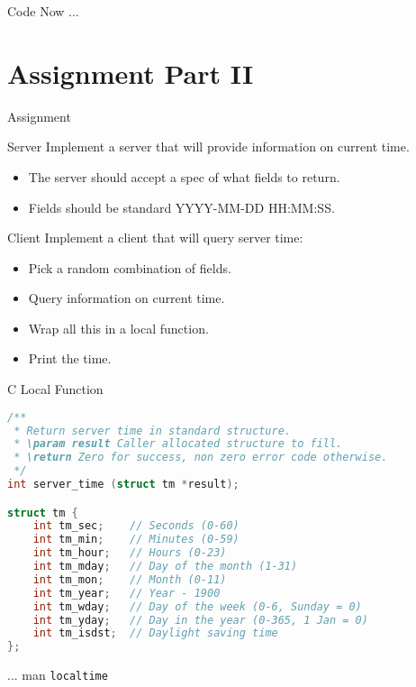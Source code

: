 \begin{frame}{Code Now ...}
\end{frame}


\section{Assignment Part II}


\begin{frame}{Assignment}
    \begin{block}{Server}
        Implement a server that will provide information on current time.
        \begin{itemize}
            \item The server should accept a spec of what fields to return.
            \item Fields should be standard YYYY-MM-DD HH:MM:SS.
        \end{itemize}
    \end{block}

    \begin{block}{Client}
        Implement a client that will query server time:
        \begin{itemize}
            \item Pick a random combination of fields.
            \item Query information on current time.
            \item Wrap all this in a local function.
            \item Print the time.
        \end{itemize}
    \end{block}
\end{frame}


\begin{frame}[fragile]{C Local Function}
\begin{lstlisting}[language=c,style=mini]
/**
 * Return server time in standard structure.
 * \param result Caller allocated structure to fill.
 * \return Zero for success, non zero error code otherwise.
 */
int server_time (struct tm *result);

struct tm {
    int tm_sec;    // Seconds (0-60)
    int tm_min;    // Minutes (0-59)
    int tm_hour;   // Hours (0-23)
    int tm_mday;   // Day of the month (1-31)
    int tm_mon;    // Month (0-11)
    int tm_year;   // Year - 1900
    int tm_wday;   // Day of the week (0-6, Sunday = 0)
    int tm_yday;   // Day in the year (0-365, 1 Jan = 0)
    int tm_isdst;  // Daylight saving time
};
\end{lstlisting}
    \hfill ... man \lstinline{localtime}
\end{frame}


